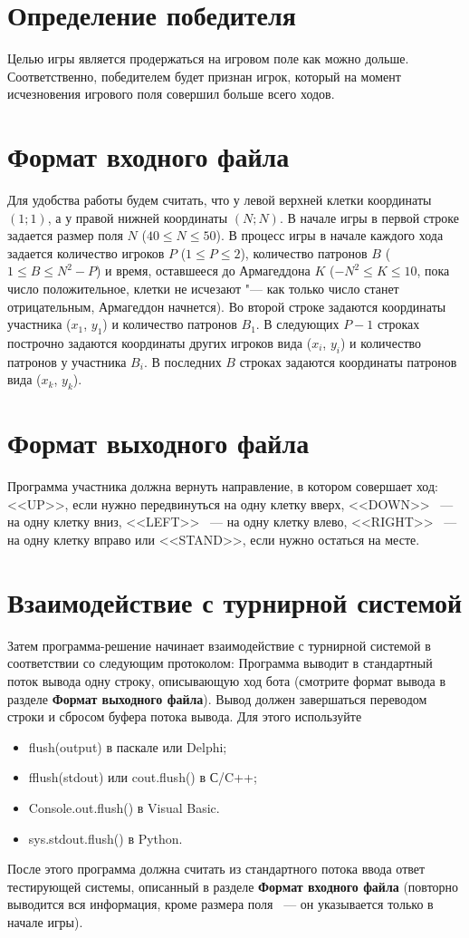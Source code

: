 \documentclass[a4paper,12pt]{article}
\begin{document}
\section{Определение победителя}
Целью игры является продержаться на игровом поле как можно дольше. Соответственно, победителем будет признан игрок, который на момент исчезновения игрового поля совершил больше всего ходов.

\section{Формат входного файла}
Для удобства работы будем считать, что у левой верхней клетки координаты $(1;1)$, а у правой нижней координаты $(N;N)$. В начале игры в первой строке задается размер поля $N$ ($40 \leq N \leq 50$).
В процесс игры в начале каждого хода задается количество игроков $P$ ($1 \leq P \leq 2$), количество патронов $B$ ($1 \leq B \leq N^2 - P$) и время, оставшееся до Армагеддона $K$ ($-N^2 \leq K \leq 10$, пока число положительное, клетки не исчезают "--- как только число станет отрицательным, Армагеддон начнется).
Во второй строке задаются координаты участника ($x_1$, $y_1$) и количество патронов $B_1$.
В следующих $P-1$ строках построчно задаются координаты других игроков вида ($x_i$, $y_i$) и количество патронов у участника $B_i$.
В последних $B$ строках задаются координаты патронов вида ($x_k$, $y_k$).

\section{Формат выходного файла}
Программа участника должна вернуть направление, в котором совершает ход: <<UP>>, если нужно передвинуться на одну клетку вверх, <<DOWN>> ~--- на одну клетку вниз, <<LEFT>> ~--- на одну клетку влево, <<RIGHT>> ~--- на одну клетку вправо или <<STAND>>, если нужно остаться на месте.

\section{Взаимодействие с турнирной системой}
Затем программа-решение начинает взаимодействие с турнирной системой в соответствии со следующим протоколом:
Программа выводит в стандартный поток вывода одну строку, описывающую ход бота (смотрите формат вывода в разделе \textbf{Формат выходного файла}). Вывод должен завершаться переводом строки и сбросом буфера потока
вывода. Для этого используйте
\begin{itemize}
\item flush(output) в паскале или Delphi;
\item fflush(stdout) или cout.flush() в С/C++;
\item Console.out.flush() в Visual Basic.
\item sys.stdout.flush() в Python.
\end{itemize}
После этого программа должна считать из стандартного потока ввода ответ тестирующей системы, описанный в разделе \textbf{Формат входного файла} (повторно выводится вся информация, кроме размера поля ~--- он указывается только в начале игры).
\end{document}
